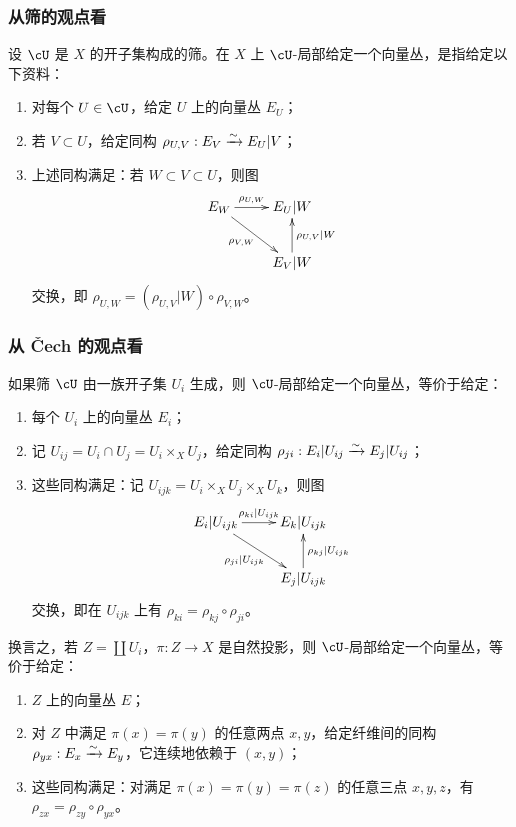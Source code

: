 \subsubsection{从筛的观点看}\label{I:1-3-1}
设 $\cU$ 是 $X$ 的开子集构成的筛。在 $X$ 上 $\cU$-局部给定一个向量丛，是指给定以下资料：
\begin{enumerate}[\indent a)]
\item 对每个 $U\in\cU$，给定 $U$ 上的向量丛 $E_U$；
\item 若 $V\subset U$，给定同构 $\rho_{U,V}:E_V\xrightarrow\sim E_U|V$；
\item 上述同构满足：若 $W\subset V\subset U$，则图
\[\xymatrix{
 E_W\ar[r]^-{\rho_{U,W}}\ar[dr]_-{\rho_{V,W}} & E_U|W\\
 & E_V|W\ar[u]_-{\rho_{U,V}|W}
}\]
交换，即 $\rho_{U,W}=(\rho_{U,V}|W)\circ\rho_{V,W}$。
\end{enumerate}

\subsubsection{从 Čech 的观点看}\label{I:1-3-2}
如果筛 $\cU$ 由一族开子集 $U_i$ 生成，则 $\cU$-局部给定一个向量丛，等价于给定：
\begin{enumerate}[\indent a)]
\item 每个 $U_i$ 上的向量丛 $E_i$；
\item 记 $U_{ij}=U_i\cap U_j=U_i\times_X U_j$，给定同构 $\rho_{ji}:E_i|U_{ij}\xrightarrow\sim E_j|U_{ij}$；
\item 这些同构满足：记 $U_{ijk}=U_i\times_X U_j\times_X U_k$，则图
\[\xymatrix{
 E_i|U_{ijk}\ar[r]^-{\rho_{ki}|U_{ijk}}\ar[dr]_-{\rho_{ji}|U_{ijk}} & E_k|U_{ijk}\\
 & E_j|U_{ijk}\ar[u]_-{\rho_{kj}|U_{ijk}}
}\]
交换，即在 $U_{ijk}$ 上有 $\rho_{ki}=\rho_{kj}\circ\rho_{ji}$。
\end{enumerate}

换言之，若 $Z=\coprod U_i$，$\pi:Z\to X$ 是自然投影，则 $\cU$-局部给定一个向量丛，等价于给定：
\begin{enumerate}[\indent a)]
\item $Z$ 上的向量丛 $E$；
\item 对 $Z$ 中满足 $\pi(x)=\pi(y)$ 的任意两点 $x,y$，给定纤维间的同构 $\rho_{yx}:E_x\xrightarrow\sim E_y$，它连续地依赖于 $(x,y)$；
\item 这些同构满足：对满足 $\pi(x)=\pi(y)=\pi(z)$ 的任意三点 $x,y,z$，有 $\rho_{zx}=\rho_{zy}\circ\rho_{yx}$。
\end{enumerate}

